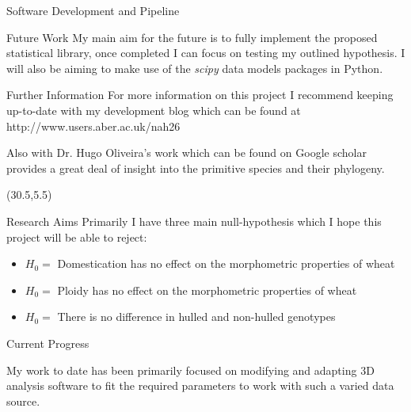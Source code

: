 \documentclass[final]{beamer}
\begin{document}
\begin{frame}{}
\begin{textblock}{28}
\begin{block}{Software Development and Pipeline}
\begin{multicols}{2}
      \end{multicols}




    \end{block}

    \begin{block}{Future Work}
      My main aim for the future is to fully implement the proposed statistical library,
      once completed I can focus on testing my outlined hypothesis.
      I will also be aiming to make use of the \textit{scipy}
      data models packages in Python.
    \end{block}


    \begin{block}{Further Information}
      For more information on this project I recommend keeping up-to-date with my development blog
      which can be found at  http://www.users.aber.ac.uk/nah26

      Also with Dr. Hugo Oliveira's work which can be found on Google scholar
      provides a great deal of insight into the primitive species
      and their phylogeny.

    \end{block}


  \end{textblock}

  \begin{textblock}{28}(30.5,5.5)

    \begin{block}{Research Aims}
      Primarily I have three main null-hypothesis which I hope this project will be able to reject:

      \begin{itemize}
      \item{$H_0=$ Domestication has no effect on the morphometric properties of wheat}
      \item{$H_0=$ Ploidy has no effect on the morphometric properties of wheat}
      \item{$H_0=$ There is no difference in hulled and non-hulled genotypes}
      \end{itemize}

    \end{block}


    \begin{block}{Current Progress}

      My work to date has been primarily focused on modifying
      and adapting 3D analysis software to fit the required
      parameters to work with such a varied data source.


\end{block}
\end{textblock}
\end{frame}
\end{document}

